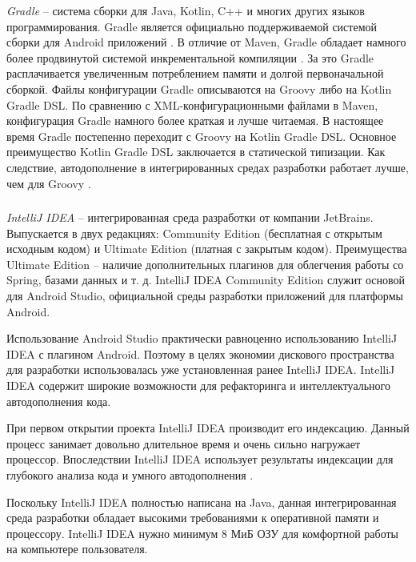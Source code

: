 \textit{Gradle} -- система сборки для Java, Kotlin, C++ и многих других языков программирования.
Gradle является официально поддерживаемой системой сборки для Android приложений \cite{android_build}.
В отличие от Maven, Gradle обладает намного более продвинутой системой инкрементальной компиляции \cite{gradle_vs_maven}.
За это Gradle расплачивается увеличенным потреблением памяти и долгой первоначальной сборкой.
Файлы конфигурации Gradle описываются на Groovy либо на Kotlin Gradle DSL.
По сравнению с XML-конфигурационными файлами в Maven, конфигурация Gradle намного более краткая и лучше читаемая.
В настоящее время Gradle постепенно переходит с Groovy на Kotlin Gradle DSL.
Основное преимущество Kotlin Gradle DSL заключается в статической типизации.
Как следствие, автодополнение в интегрированных средах разработки работает лучше, чем для Groovy \cite{kotlin_gradle_dsl_pros}.

\subsubsection{}
\label{subsub:theory_and_motivation:tools:intellij_idea}

\textit{IntelliJ IDEA} -- интегрированная среда разработки от компании JetBrains.
Выпускается в двух редакциях: Community Edition (бесплатная с открытым исходным кодом) и Ultimate Edition (платная с закрытым кодом).
Преимущества Ultimate Edition -- наличие дополнительных плагинов для облегчения работы со Spring, базами данных и т. д.
IntelliJ IDEA Community Edition служит основой для Android Studio, официальной среды разработки приложений для платформы Android.

Использование Android Studio практически равноценно использованию IntelliJ IDEA с плагином Android.
Поэтому в целях экономии дискового пространства для разработки использовалась уже установленная ранее IntelliJ IDEA.
IntelliJ IDEA содержит широкие возможности для рефакторинга и интеллектуального автодополнения кода.

При первом открытии проекта IntelliJ IDEA производит его индексацию.
Данный процесс занимает довольно длительное время и очень сильно нагружает процессор.
Впоследствии IntelliJ IDEA использует результаты индексации для глубокого анализа кода и умного автодополнения \cite{intellij_idea_features}.

Поскольку IntelliJ IDEA полностью написана на Java, данная интегрированная среда разработки обладает высокими требованиями к оперативной памяти и процессору.
IntelliJ IDEA нужно минимум 8 МиБ ОЗУ для комфортной работы на компьютере пользователя.
